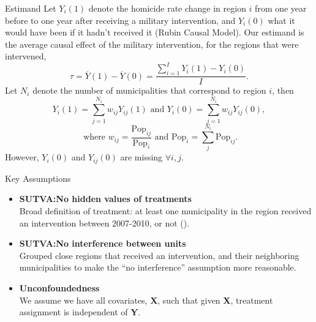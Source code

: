 \documentclass[final]{beamer}
\newlength{\onecolwid}
\begin{document}
\begin{frame}[t]
\begin{columns}[t]
\begin{column}{\onecolwid}
      \begin{block}{Estimand}
        Let $Y_i(1)$ denote the homicide rate change in region $i$ from one year before to one year after receiving a military intervention, and $Y_i(0)$ what it would have been if it hadn't received it (Rubin Causal Model). Our estimand is the average causal effect of the military intervention, for the regions that were intervened, $$\tau=\overline{Y}(1)-\overline{Y}(0)=\frac{ \sum_{i=1}^{I} Y_i(1)-Y_i(0)}{I}.$$
        Let $N_i$ denote the number of municipalities that correspond to region $i$, then 
	$$Y_i(1) = \sum_{j=1}^{N_i}w_{ij}Y_{ij}(1) \textrm{ and } Y_i(0) = \sum_{j=1}^{N_i}w_{ij}Y_{ij}(0),$$	
	$$\textrm{ where }  w_{ij}= \frac{\textrm{Pop}_{ij}}{\textrm{Pop}_{i}} \textrm{ and  }\textrm{Pop}_{i}= \sum_j^{N_i}\textrm{Pop}_{ij}.$$
	However, $Y_i(0)$ and $Y_{ij}(0)$ are missing  $\forall i, j$.
      \end{block}
      \begin{block}{Key Assumptions}
        {\small 
        \begin{itemize}
          \item \textbf{SUTVA:No hidden values of treatments}\\
            Broad definition of treatment: at least one municipality in the region received an intervention between 2007-2010, or not (\cite{NEXOS}).
          \item \textbf{SUTVA:No interference between units} \\
             Grouped close regions that received an intervention, and their neighboring municipalities to make the ``no interference'' assumption  more reasonable. %
        \item \textbf{Unconfoundedness} \\
           We assume we have all covariates, \textbf{X}, such that given \textbf{X},  treatment assignment is independent of \textbf{Y}.

\end{itemize}}
\end{block}
\end{column}
\end{columns}
\end{frame}
\end{document}
